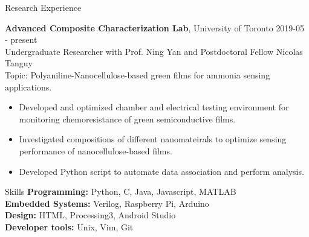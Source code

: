 \documentclass{my_resume} %
\begin{document}


    \begin{rSection}{Research Experience}
    
        {\bf Advanced Composite Characterization Lab}, University of Toronto     \hfill{2019-05 - present}\\
        Undergraduate Researcher with Prof. Ning Yan and Postdoctoral Fellow Nicolas Tanguy\\
        Topic: Polyaniline-Nanocellulose-based green films for ammonia sensing applications. 
        \begin{itemize}
            \setlength\itemsep{-0.5em}
            \item Developed and optimized chamber and electrical testing environment for monitoring chemoresistance of green semiconductive films. 
            \item Investigated compositions of different nanomateirals to optimize sensing performance of nanocellulose-based films.
            \item Developed Python script to automate data association and perform analysis.
        \end{itemize}


    \end{rSection}

        
    \begin{rSection}{Skills}
        {\bf Programming: } Python, C, Java, Javascript, MATLAB\\
        {\bf Embedded Systems: } Verilog, Raspberry Pi, Arduino \\
        {\bf Design: } HTML, Processing3, Android Studio\\ 
        {\bf Developer tools: } Unix, Vim, Git
    \end{rSection}
\end{document}

